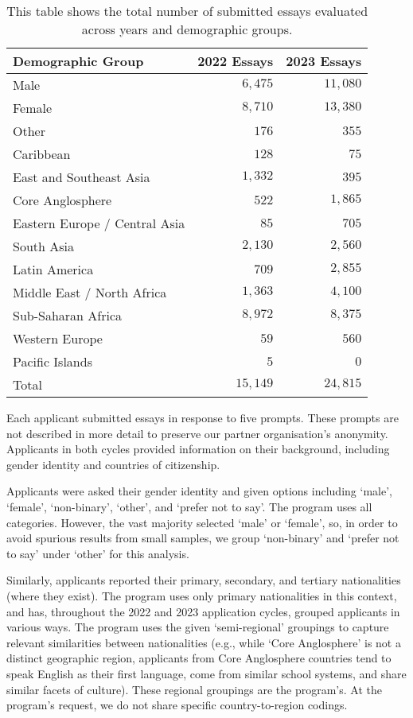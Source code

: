 \begin{table}[htbp]
    \centering
    \caption{This table shows the total number of submitted essays evaluated across years and demographic groups.}
    \label{tab:demo_counts}
    \begin{tabular}{ l r r }
        \toprule
        Demographic Group & 2022 Essays & 2023 Essays \\
        \midrule
        Male & $6,475$  & $11,080$ \\
        Female & $8,710$  & $13,380$ \\
        Other & $176$ & $355$ \\
        \midrule
        Caribbean & $128$ & $75$ \\
        East and Southeast Asia & $1,332$ & $395$ \\
        Core Anglosphere & $522$ & $1,865$ \\
        Eastern Europe / Central Asia & $85$ & $705$ \\
        South Asia & $2,130$ & $2,560$\\
        Latin America & $709$ & $2,855$ \\
        Middle East / North Africa & $1,363$ & $4,100$ \\
        Sub-Saharan Africa & $8,972$& $8,375$\\
        Western Europe & $59$ & $560$ \\
        Pacific Islands & $5$& $0$ \\
        \midrule
        Total & $15,149$ & $24,815$ \\
        \bottomrule
    \end{tabular}
\end{table}

Each applicant submitted essays in response to five prompts. These prompts are not described in more detail to preserve our partner organisation's anonymity. Applicants in both cycles provided information on their background, including gender identity and countries of citizenship. 

Applicants were asked their gender identity and given options including `male', `female', `non-binary', `other', and `prefer not to say'. The program uses all categories. However, the vast majority selected `male' or `female', so, in order to avoid spurious results from small samples, we group `non-binary' and `prefer not to say' under `other' for this analysis. 

Similarly, applicants reported their primary, secondary, and tertiary nationalities (where they exist). The program uses only primary nationalities in this context, and has, throughout the 2022 and 2023 application cycles, grouped applicants in various ways. The program uses the given `semi-regional' groupings to capture relevant similarities between nationalities (e.g., while `Core Anglosphere' is not a distinct geographic region, applicants from Core Anglosphere countries tend to speak English as their first language, come from similar school systems, and share similar facets of culture). These regional groupings are the program's. At the program's request, we do not share specific country-to-region codings.

